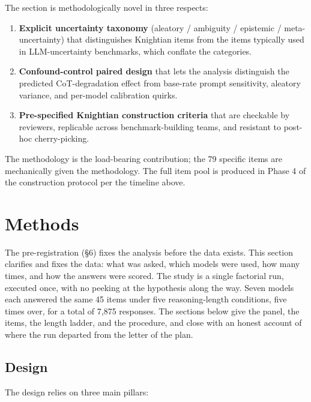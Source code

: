 \documentclass{article}
\providecommand{\tightlist}{\setlength{\itemsep}{0pt}\setlength{\parskip}{0pt}}
\begin{document}
The section is methodologically novel in three respects:

\begin{enumerate}
\def\labelenumi{\arabic{enumi}.}
\tightlist
\item
  \textbf{Explicit uncertainty taxonomy} (aleatory / ambiguity /
  epistemic / meta-uncertainty) that distinguishes Knightian items from
  the items typically used in LLM-uncertainty benchmarks, which conflate
  the categories.
\item
  \textbf{Confound-control paired design} that lets the analysis
  distinguish the predicted CoT-degradation effect from base-rate prompt
  sensitivity, aleatory variance, and per-model calibration quirks.
\item
  \textbf{Pre-specified Knightian construction criteria} that are
  checkable by reviewers, replicable across benchmark-building teams,
  and resistant to post-hoc cherry-picking.
\end{enumerate}

The methodology is the load-bearing contribution; the 79 specific items
are mechanically given the methodology. The full item pool is produced
in Phase 4 of the construction protocol per the timeline above.

\section{Methods}\label{chapter-5-methods}

The pre-registration (\S{}6) fixes the analysis before the data exists.
This section clarifies and fixes the data: what was asked, which models
were used, how many times, and how the answers were scored. The study is
a single factorial run, executed once, with no peeking at the hypothesis
along the way. Seven models each answered the same 45 items under five
reasoning-length conditions, five times over, for a total of 7,875
responses. The sections below give the panel, the items, the length
ladder, and the procedure, and close with an honest account of where the
run departed from the letter of the plan.

\subsection{Design}\label{design}

The design relies on three main pillars:
\end{document}
